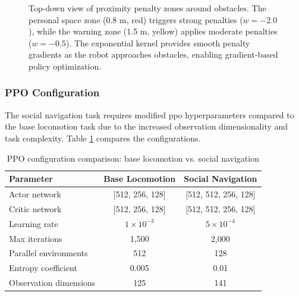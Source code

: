 \documentclass[12pt,a4paper]{article}
\begin{document}
\begin{figure}[htbp]
\caption[Proximity penalty zones]{Top-down view of proximity penalty zones around obstacles. The personal space zone (0.8 m, red) triggers strong penalties ($w = -2.0$), while the warning zone (1.5 m, yellow) applies moderate penalties ($w = -0.5$). The exponential kernel provides smooth penalty gradients as the robot approaches obstacles, enabling gradient-based policy optimization.}
\label{fig:proximity_zones}
\end{figure}

\subsubsection{PPO Configuration}

The social navigation task requires modified \ac{ppo} hyperparameters compared to the base locomotion task due to the increased observation dimensionality and task complexity. Table \ref{tab:ppo_comparison} compares the configurations.

\begin{table}[htbp]
\centering
\caption{PPO configuration comparison: base locomotion vs. social navigation}
\label{tab:ppo_comparison}
\begin{tabular}{lcc}
\toprule
\textbf{Parameter} & \textbf{Base Locomotion} & \textbf{Social Navigation} \\
\midrule
Actor network & [512, 256, 128] & [512, 512, 256, 128] \\
Critic network & [512, 256, 128] & [512, 512, 256, 128] \\
Learning rate & $1 \times 10^{-3}$ & $5 \times 10^{-4}$ \\
Max iterations & 1,500 & 2,000 \\
Parallel environments & 512 & 128 \\
Entropy coefficient & 0.005 & 0.01 \\
Observation dimensions & 125 & 141 \\
\bottomrule
\end{tabular}
\end{table}
\end{document}
